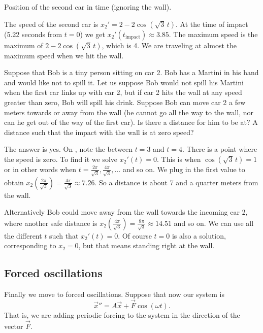 \begin{example}
\begin{mywrapfig}{3.25in}
\capstart
{}
\caption{Position of the second car in time (ignoring the wall).\label{sosa:railcarfig}}
\end{mywrapfig}


The speed of the second car is $x_2' = 2 - 2 \cos ( \sqrt{3} \, t)$.
At the time of impact (5.22 seconds from $t=0$) we get 
$x_2'(t_{\text{impact}}) \approx 3.85$.
%
The maximum speed is the maximum of $2 - 2 \cos ( \sqrt{3} \, t )$, which is 4.
We are traveling at almost the maximum speed when we hit the wall.

\medskip

Suppose that Bob is a tiny person sitting on car 2.  Bob has a Martini in
his hand and would like not to spill it.  Let us suppose Bob would not spill
his Martini
when the first car links up with car 2, but if car 2 hits the wall at any
speed greater than zero, Bob will spill his drink.  Suppose Bob
can move car 2
a few meters towards or away from the wall (he cannot go all the way to the
wall, nor can he get out of the way of the first car).  Is there a
distance for him to be at?  A distance such that the impact with
the wall is at zero speed?

The answer is yes.  On ,
note the  between $t=3$ and $t=4$.  There is a point where
the speed is zero.  To find it we solve $x_2'(t) = 0$.  This is when
$\cos ( \sqrt{3} \, t) = 1$ or in other words when $t = \frac{2 \pi}{\sqrt{3}}, 
\frac{4 \pi}{\sqrt{3}},\ldots$ and so on.  We plug in the first value to obtain
$x_2\left(\frac{2 \pi}{\sqrt{3}}\right) = 
\frac{4 \pi}{\sqrt{3}} \approx 7.26$.  So a  distance is about 7 and a
quarter meters from the wall.

Alternatively Bob could move away from the wall
towards the incoming car 2, where another safe distance is
$x_2 \left( \frac{4 \pi}{\sqrt{3}} \right) = \frac{8 \pi}{\sqrt{3}}
\approx 14.51$ and so on.  We can use all the different
$t$ such that $x_2'(t) = 0$.  Of course $t=0$ is also a solution,
corresponding to $x_2 = 0$, but
that means standing right at the wall.
\end{example}

\subsection{Forced oscillations}

Finally we move to forced oscillations.
Suppose that now our system is
\begin{equation} \label{sosa:forcedeq}
{\vec{x}}'' = A \vec{x} + \vec{F} \cos ( \omega t) .
\end{equation}
That is, we are adding periodic forcing to the system in the direction of
the vector $\vec{F}$.

